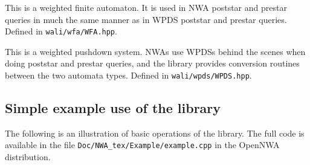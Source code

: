 \begin{functionlist}
   This is a weighted finite automaton. It is
    used in NWA poststar and prestar queries in much the same manner as in
    WPDS poststar and prestar queries. Defined in \texttt{wali/wfa/WFA.hpp}.

   This is a weighted pushdown system. NWAs use
    WPDSs behind the scenes when doing poststar and prestar queries, and the
    library provides conversion routines between the two automata
    types. Defined in \texttt{wali/wpds/WPDS.hpp}.
\end{functionlist}


\subsection{Simple example use of the library}
\label{Se:ExampleUse}
The following is an illustration of basic operations of the library. The full
code is available in the file \texttt{Doc/NWA\_tex/Example/example.cpp} in the
OpenNWA distribution.

\inputminted{c++}{Example/example-abbrev.cpp}

